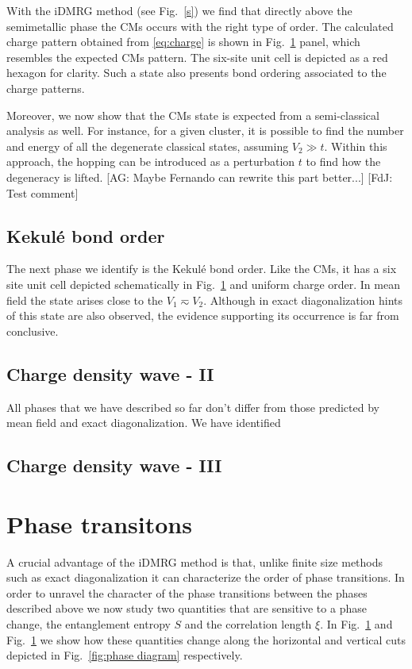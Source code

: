\documentclass[aps,prx,10pt,twocolumn,floatfix,superscriptaddress,showpacs,numerical,footinbib]{revtex4-1}
\newcommand{\noteAG}[1]{{\color{blue} [AG: #1]}}
\newcommand{\noteFdJ}[1]{{\color{cyan} [FdJ: #1]}}
\begin{document}
With the iDMRG method (see Fig.~\ref{s}) we find that directly above the semimetallic phase the CMs occurs with the right type of order.
%
The calculated charge pattern obtained from \eqref{eq:charge} is shown in Fig.~\ref{} panel, which resembles the expected
CMs pattern.
%
The six-site unit cell is depicted as a red hexagon for clarity. 
%
Such a state also presents bond ordering associated to the charge patterns.

% 
Moreover, we now show that the CMs state is expected from a semi-classical analysis as well.
%
For instance, for a given cluster, it is possible to find the number and energy of all the degenerate classical states, assuming $V_{2}\gg t$.
%
Within this approach, the hopping can be introduced as a perturbation $t$ to find how the degeneracy is lifted.
\noteAG{Maybe Fernando can rewrite this part better...} \noteFdJ{Test comment}


\subsection{Kekul\'{e} bond order}
%
The next phase we identify is the Kekul\'{e}
bond order.
%
Like the CMs, it has a six site unit cell depicted schematically in Fig.~\ref{}
and uniform charge order.
%
In mean field the state arises close to the $V_{1}\eqsim V_{2}$.
%
Although in exact diagonalization hints of this state are also observed,
the evidence supporting its occurrence is far from conclusive.



\subsection{Charge density wave - II}
%
All phases that we have described so far don't differ
from those predicted by mean field and exact diagonalization.
%
We have identified
%
\subsection{Charge density wave - III}
%



\section{Phase transitons}
%
A crucial advantage of the iDMRG method is that, unlike finite
size methods such as exact diagonalization it can characterize the order of phase transitions.
%
In order to unravel the character of the phase transitions between
the phases described above we now study two quantities that are sensitive
to a phase change, the entanglement entropy $S$ and the correlation length $\xi$.
%
In Fig.~\ref{}  and Fig.~\ref{} we show how these quantities change along
the horizontal and vertical cuts depicted in Fig.~\ref{fig:phase diagram} respectively.
%
\end{document}

